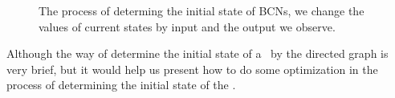 \begin{figure}[thpb]
      \centering
      
      \caption{The process of determing the initial state of BCNs, we change the values of current states by input and the output we observe. }
      \label{fig:5}
   \end{figure}

Although the way of determine the initial state of a \BCN\ by the directed graph is very brief, but it would help us present how to do some optimization in the process of determining the initial state of the \BCNs.

